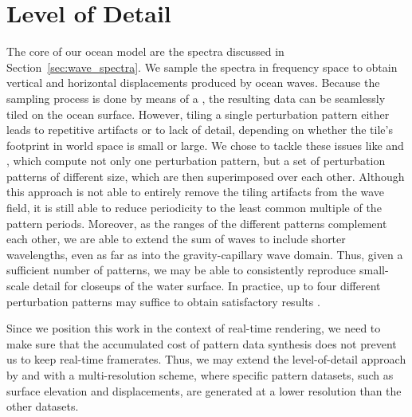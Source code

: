 \section{Level of Detail}
\label{sec:level_of_detail}
The core of our ocean model are the spectra discussed in 
Section~\ref{sec:wave_spectra}. We sample the spectra in 
frequency space to obtain vertical and horizontal displacements produced by 
ocean waves. Because the sampling process is done by means of a \DiscreteFourierTransform,
the resulting data can be seamlessly tiled on the ocean surface. 
However, tiling a single perturbation pattern either leads to repetitive 
artifacts or to lack of detail, depending on whether the tile's footprint in
world space is small or large. We chose to tackle these 
issues like \citet{misc:oceanlightingfft} and \citet{article:whitecaps},
which compute not only one perturbation pattern, but a set of perturbation
patterns of different size, which are then superimposed over each other.
Although this approach is not able to entirely remove the tiling artifacts from
the wave field, it is still able to reduce periodicity to the least common
multiple of the pattern periods.
Moreover, as the \wavenumber ranges of the different patterns complement each
other, we are able to extend the sum of waves to include shorter wavelengths,
even as far as into the gravity-capillary wave domain.
Thus, given a sufficient number of patterns,
we may be able to consistently reproduce small-scale detail for closeups of the
water surface.
In practice, up to four different perturbation patterns may suffice to obtain
satisfactory results \citep{article:whitecaps}.

Since we position this work in the context of real-time rendering,
we need to make sure that the accumulated cost of pattern data synthesis
does not prevent us to keep real-time framerates. 
Thus, we may extend the level-of-detail approach by \citet{misc:oceanlightingfft} and
\citet{article:whitecaps} with a multi-resolution scheme, where specific pattern
datasets, such as surface elevation and displacements, are generated at a lower
resolution than the other datasets. 

